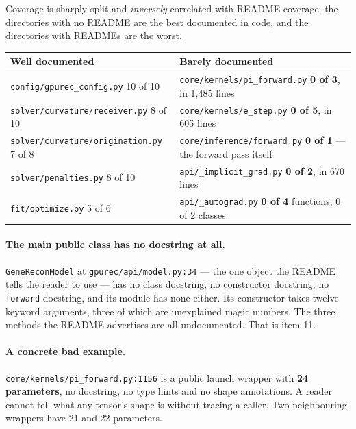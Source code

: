 \documentclass[11pt]{article}
\newcommand{\loc}[1]{\nolinkurl{#1}}
\begin{document}
Coverage is sharply split and \emph{inversely} correlated with README coverage:
the directories with no README are the best documented in code, and the
directories with READMEs are the worst.

\begin{center}
\begin{tabular}{@{}p{}p{}@{}}
\toprule
Well documented & Barely documented \\
\midrule
\loc{config/gpurec\_config.py} 10 of 10 &
  \loc{core/kernels/pi\_forward.py} \textbf{0 of 3}, in 1{,}485 lines \\
\loc{solver/curvature/receiver.py} 8 of 10 &
  \loc{core/kernels/e\_step.py} \textbf{0 of 5}, in 605 lines \\
\loc{solver/curvature/origination.py} 7 of 8 &
  \loc{core/inference/forward.py} \textbf{0 of 1} --- the forward pass itself \\
\loc{solver/penalties.py} 8 of 10 &
  \loc{api/\_implicit\_grad.py} \textbf{0 of 2}, in 670 lines \\
\loc{fit/optimize.py} 5 of 6 &
  \loc{api/\_autograd.py} \textbf{0 of 4} functions, 0 of 2 classes \\
\bottomrule
\end{tabular}
\end{center}

\paragraph{The main public class has no docstring at all.}
\texttt{GeneReconModel} at \loc{gpurec/api/model.py:34} --- the one object the
README tells the reader to use --- has no class docstring, no constructor
docstring, no \texttt{forward} docstring, and its module has none either.  Its
constructor takes twelve keyword arguments, three of which are unexplained
magic numbers.  The three methods the README advertises are all undocumented.
That is item 11.

\paragraph{A concrete bad example.}  \loc{core/kernels/pi\_forward.py:1156} is a
public launch wrapper with \textbf{24 parameters}, no docstring, no type hints
and no shape annotations.  A reader cannot tell what any tensor's shape is
without tracing a caller.  Two neighbouring wrappers have 21 and 22 parameters.
\end{document}
